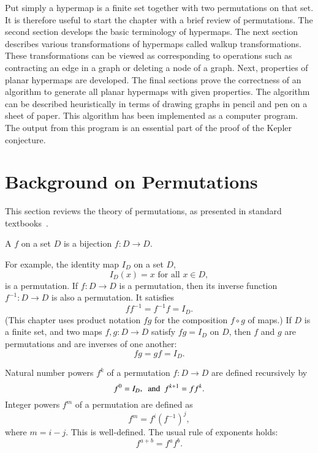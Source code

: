 \begin{summary}
Put simply a hypermap  is a finite set together
with two permutations on that set.  It is therefore useful to start
the chapter with a brief review of permutations.  The second section
develops the basic terminology of hypermaps.  The next section
describes various transformations of hypermaps called walkup
transformations.  These transformations can be viewed as corresponding
to  operations such as contracting an edge in a graph or deleting
a node of a graph.  Next, properties of planar hypermaps are
developed.  The final sections prove the correctness of an algorithm
to generate all planar hypermaps with given properties.  The algorithm
can be described heuristically in terms of drawing graphs in pencil
and pen on a sheet of paper.  This algorithm has been implemented as a
computer program.  The output from this program is an essential part
of the proof of the Kepler conjecture.
\end{summary}


\section{Background on Permutations}

This section reviews the theory of permutations, as presented in
standard textbooks~\cite{unknown}.

\begin{definition}[permutation]
A  $f$ on a set
  $D$ is a bijection $f:D\to D$.
\end{definition}

For example, the identity map $I_D$ on a set $D$,
\[ 
I_D(x)=x \text{ for all } x \in D,
\] 
 is a permutation.
If $f:D\to D$ is a permutation, then  its inverse function $f^{-1}:D\to D$
is also a permutation.  
It satisfies
\[ 
f f^{-1} = f^{-1} f = I_D.
\] 
(This chapter uses product notation $f g$ for the composition $f\circ g$ of maps.)
If $D$ is a finite set, and two maps
$f,g:D\to D$ satisfy $f g = I_D$ on $D$, then $f$ and $g$ are permutations and are
inverses of one another:
\[ 
f g = g f = I_D.
\] 

Natural number powers  $f^k$ of a permutation $f:D\to D$ are defined
recursively by
\[ 
f^0 = I_D,\text{ \ and \ }  f^{k+1} = f f^k.
\] 
Integer powers $f^m$ of a permutation are defined as
\[f^m = f^i (f^{-1})^j,\] where $m = i -j$.  This is well-defined.
The usual rule of exponents holds:
\[ 
f^{a+b} = f^a f^b.
\] 

